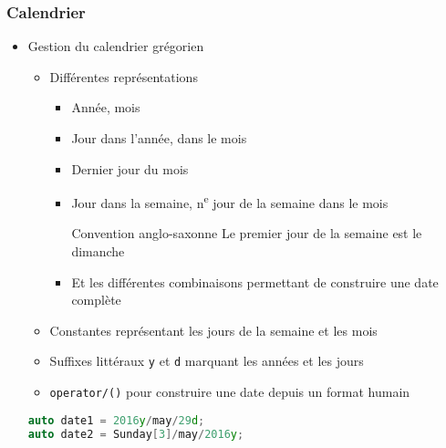 \documentclass[C++.tex]{subfiles}
\begin{document}
\begin{frame}[fragile]
	\frametitle{Calendrier}
	\begin{itemize}
		\item Gestion du calendrier grégorien
		\begin{itemize}
			\item Différentes représentations
			\begin{itemize}
				\item Année, mois
				\item Jour dans l'année, dans le mois
				\item Dernier jour du mois
				\item Jour dans la semaine, n\textsuperscript{e} jour de la semaine dans le mois

				\begin{alertblock}{Convention anglo-saxonne}
					Le premier jour de la semaine est le dimanche
				\end{alertblock}

				\item Et les différentes combinaisons permettant de construire une date complète
			\end{itemize}
			\item Constantes représentant les jours de la semaine et les mois
			\item Suffixes littéraux \lstinline|y| et \lstinline|d| marquant les années et les jours
			\item \lstinline|operator/()| pour construire une date depuis un format \og humain\fg{}
		\end{itemize}

		\begin{lstlisting}[language=C++]
auto date1 = 2016y/may/29d;
auto date2 = Sunday[3]/may/2016y;\end{lstlisting}
	\end{itemize}
\end{frame}
\end{document}
